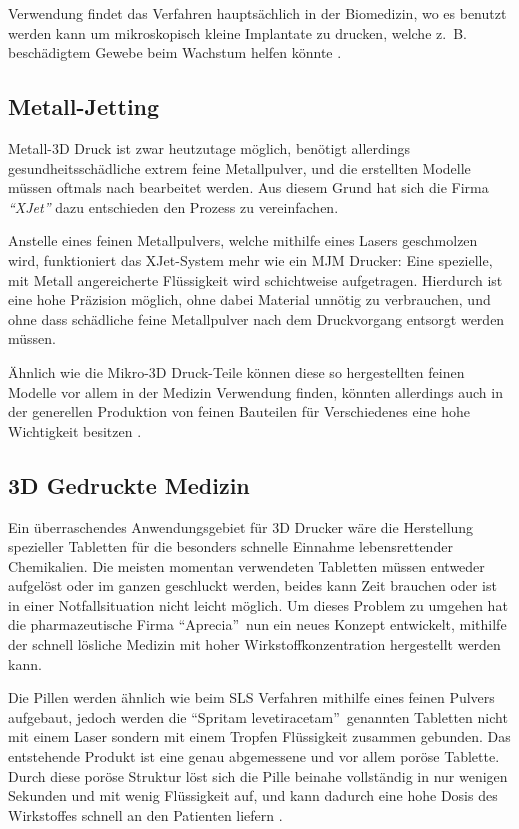 Verwendung findet das Verfahren hauptsächlich in der Biomedizin, wo es benutzt werden kann um mikroskopisch kleine Implantate zu drucken, welche z.~B. beschädigtem Gewebe beim Wachstum helfen könnte \parencite{MICROPRINT}.

\subsection{Metall-Jetting}
Metall-3D Druck ist zwar heutzutage möglich, benötigt allerdings gesundheitsschädliche extrem feine Metallpulver, und die erstellten Modelle müssen oftmals nach bearbeitet werden. Aus diesem Grund hat sich die Firma \emph{\textquotedblleft XJet\textquotedblright} dazu entschieden den Prozess zu vereinfachen. 

Anstelle eines feinen Metallpulvers, welche mithilfe eines Lasers geschmolzen wird, funktioniert das XJet-System mehr wie ein MJM Drucker: Eine spezielle, mit Metall angereicherte Flüssigkeit wird schichtweise aufgetragen. Hierdurch ist eine hohe Präzision möglich, ohne dabei Material unnötig zu verbrauchen, und ohne dass schädliche feine Metallpulver nach dem Druckvorgang entsorgt werden müssen.

Ähnlich wie die Mikro-3D Druck-Teile können diese so hergestellten feinen Modelle vor allem in der Medizin Verwendung finden, könnten allerdings auch in der generellen Produktion von feinen Bauteilen für Verschiedenes eine hohe Wichtigkeit besitzen \parencite{XJET}.

\subsection{3D Gedruckte Medizin}
Ein überraschendes Anwendungsgebiet für 3D Drucker wäre die Herstellung spezieller Tabletten für die besonders schnelle Einnahme lebensrettender Chemikalien. Die meisten momentan verwendeten Tabletten müssen entweder aufgelöst oder im ganzen geschluckt werden, beides kann Zeit brauchen oder ist in einer Notfallsituation nicht leicht möglich. Um dieses Problem zu umgehen hat die pharmazeutische Firma \textquotedblleft Aprecia\textquotedblright ~nun ein neues Konzept entwickelt, mithilfe der schnell lösliche Medizin mit hoher Wirkstoffkonzentration hergestellt werden kann.

Die Pillen werden ähnlich wie beim SLS Verfahren mithilfe eines feinen Pulvers aufgebaut, jedoch werden die \textquotedblleft Spritam levetiracetam\textquotedblright ~genannten Tabletten nicht mit einem Laser sondern mit einem Tropfen Flüssigkeit zusammen gebunden. Das entstehende Produkt ist eine genau abgemessene und vor allem poröse Tablette. Durch diese poröse Struktur löst sich die Pille beinahe vollständig in nur wenigen Sekunden und mit wenig Flüssigkeit auf, und kann dadurch eine hohe Dosis des Wirkstoffes schnell an den Patienten liefern \parencite{Printed_Drug}.